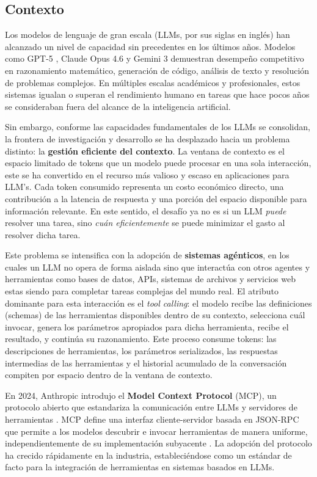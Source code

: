 \subsection{Contexto}

Los modelos de lenguaje de gran escala (LLMs, por sus siglas en inglés) han alcanzado
un nivel de capacidad sin precedentes en los últimos años. Modelos como GPT-5
\citep{openai2025gpt5}, Claude Opus 4.6 \citep{anthropic2025opus} y Gemini 3
\citep{google2025gemini3} demuestran desempeño competitivo en razonamiento
matemático, generación de código, análisis de texto y resolución de problemas
complejos. En múltiples escalas académicos y profesionales, estos sistemas
igualan o superan el rendimiento humano en tareas que hace pocos años se
consideraban fuera del alcance de la inteligencia artificial.

Sin embargo, conforme las capacidades fundamentales de los LLMs se consolidan,
la frontera de investigación y desarrollo se ha desplazado hacia un problema
distinto: la \textbf{gestión eficiente del contexto}. La ventana de contexto
es el espacio limitado de tokens que un modelo puede procesar en una sola
interacción, este se ha convertido en el recurso más valioso y escaso en
aplicaciones para LLM's. Cada token consumido representa un costo económico
directo, una contribución a la latencia de respuesta y una porción del espacio
disponible para información relevante. En este sentido, el desafío ya no es si
un LLM \textit{puede} resolver una tarea, sino \textit{cuán eficientemente}
se puede minimizar el gasto al resolver dicha tarea.

Este problema se intensifica con la adopción de \textbf{sistemas agénticos}, en
los cuales un LLM no opera de forma aislada sino que interactúa con otros agentes y herramientas como
bases de datos, APIs, sistemas de archivos y servicios web estas siendo para
completar tareas complejas del mundo real. El atributo dominante para esta interacción es
el \textit{tool calling}: el modelo recibe las definiciones (schemas) de las
herramientas disponibles dentro de su contexto, selecciona cuál invocar, genera
los parámetros apropiados para dicha herramienta, recibe el resultado, y continúa su razonamiento.
Este proceso consume tokens: las descripciones de herramientas,
los parámetros serializados, las respuestas intermedias de las herramientas y el historial acumulado
de la conversación compiten por espacio dentro de la ventana de contexto.

En 2024, Anthropic introdujo el \textbf{Model Context Protocol} (MCP), un
protocolo abierto que estandariza la comunicación entre LLMs y servidores de
herramientas \citep{anthropic2024mcp}. MCP define una interfaz cliente-servidor
basada en JSON-RPC que permite a los modelos descubrir e invocar herramientas de
manera uniforme, independientemente de su implementación subyacente
\citep{mcpspec2024}. La adopción del protocolo ha crecido rápidamente en la
industria, estableciéndose como un estándar de facto para la integración de
herramientas en sistemas basados en LLMs.


